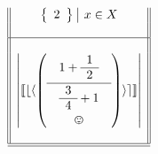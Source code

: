 \documentclass{article}
\begin{document}
\[\begin{array}{||c||}
\begin{Bmatrix}
\begin{array}{c}
          	2
     	\end{array}
 	\end{Bmatrix}~\vline~ x \in X\\\\ \hline \\
 	\begin{vmatrix}
     	\llbracket
     	\lfloor
     	\langle
     	\begin{pmatrix}
         	\begin{array}{c}
              	1 + \begin{array}{c}
                   	1  \\\hline
                   	2
              	\end{array}  \\\hline
              	\begin{array}{c}
                   	\begin{array}{c}
                        	3  \\\hline
                        	4
                   	\end{array} + 1 \\
                   	\smiley
              	\end{array}
         	\end{array}
     	\end{pmatrix}
     	\rangle
     	\rceil
     	\rrbracket
 	\end{vmatrix} \\\\\hline\hline
\end{array}\]
\end{document}
